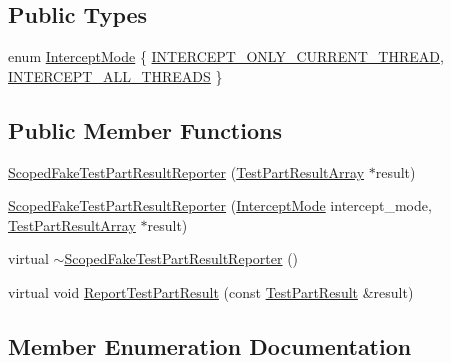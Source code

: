 \subsection*{Public Types}
\begin{DoxyCompactItemize}
\item 
enum \hyperlink{classtesting_1_1ScopedFakeTestPartResultReporter_a82f6209b3cf5c4b15ec8bd8041dbc2d5}{Intercept\+Mode} \{ \hyperlink{classtesting_1_1ScopedFakeTestPartResultReporter_a82f6209b3cf5c4b15ec8bd8041dbc2d5aed6c5f87d33207768db503526e6a1e8a}{I\+N\+T\+E\+R\+C\+E\+P\+T\+\_\+\+O\+N\+L\+Y\+\_\+\+C\+U\+R\+R\+E\+N\+T\+\_\+\+T\+H\+R\+E\+AD}, 
\hyperlink{classtesting_1_1ScopedFakeTestPartResultReporter_a82f6209b3cf5c4b15ec8bd8041dbc2d5a187f4164aad7fbb9414b263c68a693cd}{I\+N\+T\+E\+R\+C\+E\+P\+T\+\_\+\+A\+L\+L\+\_\+\+T\+H\+R\+E\+A\+DS}
 \}
\end{DoxyCompactItemize}
\subsection*{Public Member Functions}
\begin{DoxyCompactItemize}
\item 
\hyperlink{classtesting_1_1ScopedFakeTestPartResultReporter_aa0100ecf4799fb51d45167be6a5de1d5}{Scoped\+Fake\+Test\+Part\+Result\+Reporter} (\hyperlink{classtesting_1_1TestPartResultArray}{Test\+Part\+Result\+Array} $\ast$result)
\item 
\hyperlink{classtesting_1_1ScopedFakeTestPartResultReporter_a57cbc09ed48627c8a73e622618dc4b4f}{Scoped\+Fake\+Test\+Part\+Result\+Reporter} (\hyperlink{classtesting_1_1ScopedFakeTestPartResultReporter_a82f6209b3cf5c4b15ec8bd8041dbc2d5}{Intercept\+Mode} intercept\+\_\+mode, \hyperlink{classtesting_1_1TestPartResultArray}{Test\+Part\+Result\+Array} $\ast$result)
\item 
virtual \hyperlink{classtesting_1_1ScopedFakeTestPartResultReporter_a4817d59ca70228ebd5d5c3c4e8dd729d}{$\sim$\+Scoped\+Fake\+Test\+Part\+Result\+Reporter} ()
\item 
virtual void \hyperlink{classtesting_1_1ScopedFakeTestPartResultReporter_a82531434f51632d98ed7cdcdb10b8b92}{Report\+Test\+Part\+Result} (const \hyperlink{classtesting_1_1TestPartResult}{Test\+Part\+Result} \&result)
\end{DoxyCompactItemize}


\subsection{Member Enumeration Documentation}
